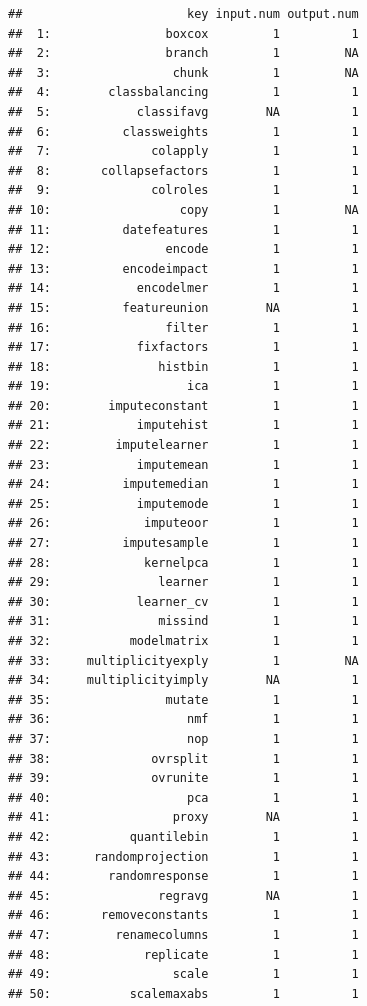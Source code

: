 \documentclass[
]{scrbook}
\begin{document}
\begin{verbatim}
##                       key input.num output.num
##  1:                boxcox         1          1
##  2:                branch         1         NA
##  3:                 chunk         1         NA
##  4:        classbalancing         1          1
##  5:            classifavg        NA          1
##  6:          classweights         1          1
##  7:              colapply         1          1
##  8:       collapsefactors         1          1
##  9:              colroles         1          1
## 10:                  copy         1         NA
## 11:          datefeatures         1          1
## 12:                encode         1          1
## 13:          encodeimpact         1          1
## 14:            encodelmer         1          1
## 15:          featureunion        NA          1
## 16:                filter         1          1
## 17:            fixfactors         1          1
## 18:               histbin         1          1
## 19:                   ica         1          1
## 20:        imputeconstant         1          1
## 21:            imputehist         1          1
## 22:         imputelearner         1          1
## 23:            imputemean         1          1
## 24:          imputemedian         1          1
## 25:            imputemode         1          1
## 26:             imputeoor         1          1
## 27:          imputesample         1          1
## 28:             kernelpca         1          1
## 29:               learner         1          1
## 30:            learner_cv         1          1
## 31:               missind         1          1
## 32:           modelmatrix         1          1
## 33:     multiplicityexply         1         NA
## 34:     multiplicityimply        NA          1
## 35:                mutate         1          1
## 36:                   nmf         1          1
## 37:                   nop         1          1
## 38:              ovrsplit         1          1
## 39:              ovrunite         1          1
## 40:                   pca         1          1
## 41:                 proxy        NA          1
## 42:           quantilebin         1          1
## 43:      randomprojection         1          1
## 44:        randomresponse         1          1
## 45:               regravg        NA          1
## 46:       removeconstants         1          1
## 47:         renamecolumns         1          1
## 48:             replicate         1          1
## 49:                 scale         1          1
## 50:           scalemaxabs         1          1

\end{verbatim}
\end{document}

